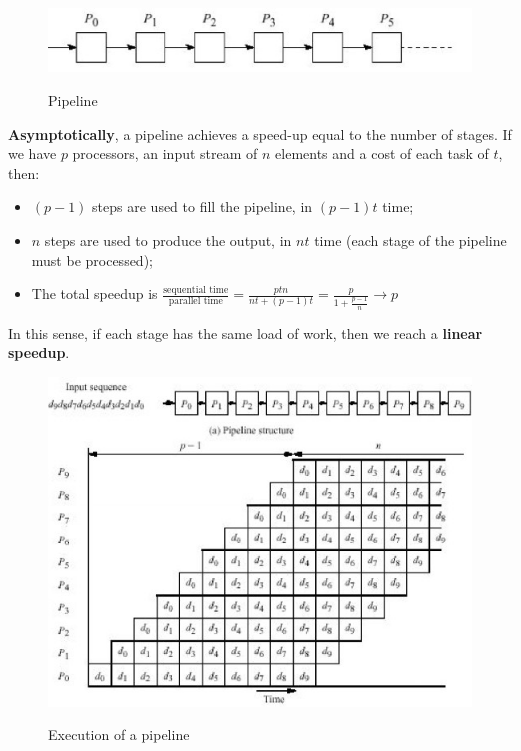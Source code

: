 \begin{figure}[h!]
		\centering
		\includegraphics[scale = 2.0]{img/pipeline1.jpg}
        \label{pipeline1}
        \caption{Pipeline}
\end{figure}

\textbf{Asymptotically}, a pipeline achieves a speed-up equal to the number of stages. If we have $p$ processors, an input stream of $n$ elements and a cost of each task of $t$, then:

\begin{itemize}
    \item $(p-1)$ steps are used to fill the pipeline, in $(p-1)t$ time;
    \item $n$ steps are used to produce the output, in $nt$ time (each stage of the pipeline must be processed);
    \item The total speedup is $\frac{\text{sequential time}}{\text{parallel time}} = \frac{ptn}{nt + (p-1)t} = \frac{p}{1 + \frac{p-1}{n}} \rightarrow p$
\end{itemize}

In this sense, if each stage has the same load of work, then we reach a \textbf{linear speedup}.

\begin{figure}[h!]
		\centering
		\includegraphics[scale = 2.0]{img/pipeline2.jpg}
        \label{pipeline2}
        \caption{Execution of a pipeline}
\end{figure}


